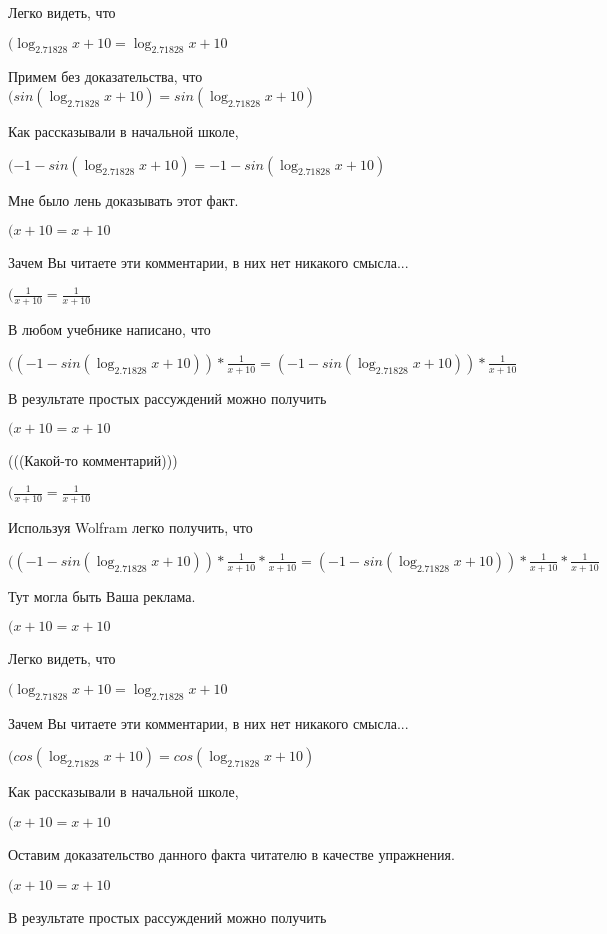 \documentclass[12pt,a4paper,fleqn]{article}
\theoremstyle{definition}
\begin{document}
Легко видеть, что

$(\log_{ 2.71828 }{ x  +  10 } = \log_{ 2.71828 }{ x  +  10 }$

Примем без доказательства, что
$(sin(\log_{ 2.71828 }{ x  +  10 }) = sin(\log_{ 2.71828 }{ x  +  10 })$

Как рассказывали в начальной школе,

$( -1  - sin(\log_{ 2.71828 }{ x  +  10 }) =  -1  - sin(\log_{ 2.71828 }{ x  +  10 })$

Мне было лень доказывать этот факт.

$( x  +  10  =  x  +  10 $

Зачем Вы читаете эти комментарии, в них нет никакого смысла...

$(\frac{ 1 }{ x  +  10 }
 = \frac{ 1 }{ x  +  10 }
$

В любом учебнике написано, что

$(( -1  - sin(\log_{ 2.71828 }{ x  +  10 })) * \frac{ 1 }{ x  +  10 }
 = ( -1  - sin(\log_{ 2.71828 }{ x  +  10 })) * \frac{ 1 }{ x  +  10 }
$

В результате простых рассуждений можно получить

$( x  +  10  =  x  +  10 $

(((Какой-то комментарий)))

$(\frac{ 1 }{ x  +  10 }
 = \frac{ 1 }{ x  +  10 }
$

Используя Wolfram легко получить, что

$(( -1  - sin(\log_{ 2.71828 }{ x  +  10 })) * \frac{ 1 }{ x  +  10 }
 * \frac{ 1 }{ x  +  10 }
 = ( -1  - sin(\log_{ 2.71828 }{ x  +  10 })) * \frac{ 1 }{ x  +  10 }
 * \frac{ 1 }{ x  +  10 }
$

Тут могла быть Ваша реклама.

$( x  +  10  =  x  +  10 $

Легко видеть, что

$(\log_{ 2.71828 }{ x  +  10 } = \log_{ 2.71828 }{ x  +  10 }$

Зачем Вы читаете эти комментарии, в них нет никакого смысла...

$(cos(\log_{ 2.71828 }{ x  +  10 }) = cos(\log_{ 2.71828 }{ x  +  10 })$

Как рассказывали в начальной школе,

$( x  +  10  =  x  +  10 $

Оставим доказательство данного факта читателю в качестве упражнения.

$( x  +  10  =  x  +  10 $

В результате простых рассуждений можно получить
\end{document}
